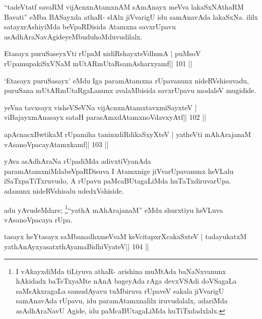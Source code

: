 \begin{artha}
``tadeVtatf savaRM vijAcnxnAtamxnAM sAmAnayx meVva lakaSxNAthaRM Bavati'' eMba BASayxda athaR- elAlx jiVvarigU idu samAnavAda lakaSxNa. ililx satayxrAshiyiMda beVpaRDisida Atamxna savxrUpavu asAdhAraNavAgideyeMbudu\break hoMduvudilalx.
\end{artha}



\begin{shl}
Etasayx puruSaseyxVti rUpaM nidiRshayxteV\s dhunA |
puMsoV rUpamupakiSxVNaM mUtARmUtaRsamAsharxyamf\hfill || 101 ||
\end{shl}

\begin{artha}
`Etasayx puruSasayx' eMdu Iga paramAtamxna rUpavanunx nideRVshisuvadu, puruSana mUtARmUtaRgaLanunx avalaMbisida savxrUpavu modaleV mugidide.
\end{artha}

\begin{shl}
yeVna tavxsayx visheVSeVNa vijAcnxnAtamxtavxmiSayxteV |
viBajayxmAnasayx sataH parasAmxdAtamxnoV\s davxyAtf\hfill || 102 ||
\end{shl}

\begin{shl}
apAcnacxBwtikaM rUpamiha taninxdiRdikaSxyXteV |
yatheVti mAhArajanaM vAsanoVpacayAtamxkamf\hfill || 103 ||
\end{shl}

\begin{artha}
yAva asAdhAraNa rUpadiMda adivxtiVyanAda paramAtamxniMda\break beVpaRDisuva
I Atamxnige jiVvarUpavanunx heVLalu iSaTxpaTiTxruvudo, A rUpavu
paMcaBUtagaLiMda huTaTxdiruvarUpa. adanunx nideRVshisalu udedxVshiside.
\end{artha}

\begin{artha}
adu yAvudeMdare; \footnote{I vAkayxdiMda tiLiyuva athaR- arishina
  muMtAda baNaNxvanunx hAkidadx baTeTxyaMte nAnA bageyAda rAga
  devxVSAdi doVSagaLa saMsAkxragaLa samudAyavu tuMbiruva
  rUpaveV sakala jiVvarigU samAnavAda rUpavu, idu paramAtamxnalilx
  iruvudalalx, adariMda asAdhAraNavU Agide, idu paMcaBUtagaLiMda 
  huTiTxdadxlalx.}``yathA mAhArajanaM'' eMdu shurxtiyu
heVLuva vAsanoVpacaya rUpa.
\end{artha}


\begin{shl}
tasayx heYtasayx saMbanadhxmeVvaM keVcitapxrXcakaSxteV |
tadayukatxM yathA\s nAyxyasatxthA\s yamaBidhiVyateV\hfill || 104 ||
\end{shl}

